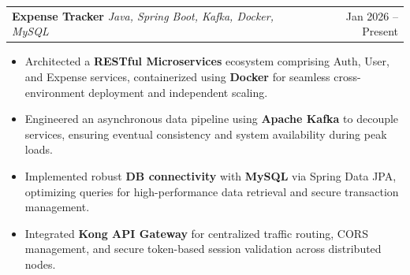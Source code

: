 \documentclass[letterpaper,11pt]{article}
\makeatletter
\newcommand{\resumeItem}[1]{
    \item\small{
      {#1 \vspace{-2pt}}
    }
  }
\newcommand{\resumeProjectHeading}[2]{
      \item
      \begin{tabular*}{0.97\textwidth}{l@{\extracolsep{\fill}}r}
        \small#1 & #2 \\
      \end{tabular*}\vspace{-7pt}
  }
\newcommand{\resumeItemListStart}{\begin{itemize}}
\newcommand{\resumeItemListEnd}{\end{itemize}\vspace{-5pt}}
\makeatother
\begin{document}
          
          
          
          

          \resumeProjectHeading
      {\textbf{Expense Tracker} \emph{Java, Spring Boot, Kafka, Docker, MySQL}}{Jan 2026 --  Present}
      \resumeItemListStart
          \resumeItem{Architected a \textbf{RESTful Microservices} ecosystem comprising Auth, User, and Expense services, containerized using \textbf{Docker} for seamless cross-environment deployment and independent scaling.}
          \resumeItem{Engineered an asynchronous data pipeline using \textbf{Apache Kafka} to decouple services, ensuring eventual consistency and system availability during peak loads.}
          \resumeItem{Implemented robust \textbf{DB connectivity} with \textbf{MySQL} via Spring Data JPA, optimizing queries for high-performance data retrieval and secure transaction management.}
          \resumeItem{Integrated \textbf{Kong API Gateway} for centralized traffic routing, CORS management, and secure token-based session validation across distributed nodes.}
      \resumeItemListEnd
          
          
\end{document}

